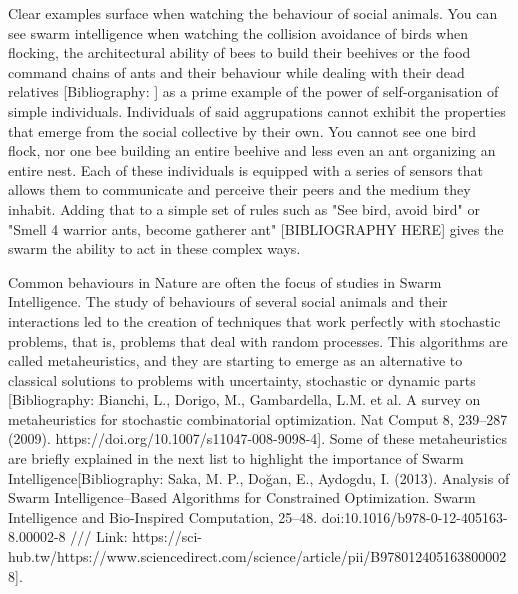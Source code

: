 Clear examples surface when watching the behaviour of social animals. You can see swarm intelligence when watching the collision avoidance of birds when flocking, the architectural ability of bees to build their beehives or the food command chains of ants and their behaviour while dealing with their dead relatives [Bibliography: ] as a prime example of the power of self-organisation of simple individuals. Individuals of said aggrupations cannot exhibit the properties that emerge from the social collective by their own. You cannot see one bird flock, nor one bee building an entire beehive and less even an ant organizing an entire nest. Each of these individuals is equipped with a series of sensors that allows them to communicate and perceive their peers and the medium they inhabit. Adding that to a simple set of rules such as "See bird, avoid bird" or "Smell 4 warrior ants, become gatherer ant" [BIBLIOGRAPHY HERE] gives the swarm the ability to act in these complex ways.

Common behaviours in Nature are often the focus of studies in Swarm Intelligence. The study of behaviours of several social animals and their interactions led to the creation of techniques that work perfectly with stochastic problems, that is, problems that deal with random processes. This algorithms are called metaheuristics, and they are starting to emerge as an alternative to classical solutions to problems with uncertainty, stochastic or dynamic parts [Bibliography: Bianchi, L., Dorigo, M., Gambardella, L.M. et al. A survey on metaheuristics for stochastic combinatorial optimization. Nat Comput 8, 239–287 (2009). https://doi.org/10.1007/s11047-008-9098-4]. Some of these metaheuristics are briefly explained in the next list to highlight the importance of Swarm Intelligence[Bibliography: Saka, M. P., Doğan, E., Aydogdu, I. (2013). Analysis of Swarm Intelligence–Based Algorithms for Constrained Optimization. Swarm Intelligence and Bio-Inspired Computation, 25–48. doi:10.1016/b978-0-12-405163-8.00002-8 /// Link: https://sci-hub.tw/https://www.sciencedirect.com/science/article/pii/B9780124051638000028].

